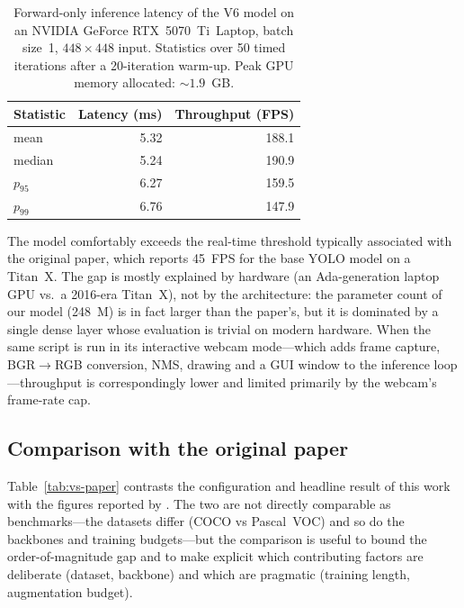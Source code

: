 \begin{table}[!ht]
\centering
\caption{Forward-only inference latency of the V6 model on an NVIDIA
GeForce RTX~5070~Ti~Laptop, batch size~1, $448\!\times\!448$ input. Statistics
over 50 timed iterations after a 20-iteration warm-up. Peak GPU memory
allocated: $\sim\!1.9$~GB.}
\label{tab:latency}
\small
\begin{tabular}{lrr}
\toprule
\textbf{Statistic} & \textbf{Latency (ms)} & \textbf{Throughput (FPS)} \\
\midrule
mean         & 5.32 & 188.1 \\
median       & 5.24 & 190.9 \\
$p_{95}$     & 6.27 & 159.5 \\
$p_{99}$     & 6.76 & 147.9 \\
\bottomrule
\end{tabular}
\end{table}

\noindent The model comfortably exceeds the real-time threshold typically
associated with the original paper, which reports 45~FPS for the base YOLO
model on a Titan~X. The gap is mostly explained by hardware
(an Ada-generation laptop GPU vs.\ a 2016-era Titan~X), not by the
architecture: the parameter count of our model (248~M) is in fact larger than
the paper's, but it is dominated by a single dense layer whose evaluation is
trivial on modern hardware. When the same script is run in its interactive
webcam mode---which adds frame capture, BGR$\to$RGB conversion, NMS, drawing
and a GUI window to the inference loop---throughput is correspondingly lower
and limited primarily by the webcam's frame-rate cap.

\subsection{Comparison with the original paper}
\label{sec:results:vs-paper}

Table~\ref{tab:vs-paper} contrasts the configuration and headline result of
this work with the figures reported by \citet{redmon2016you}. The two are not
directly comparable as benchmarks---the datasets differ (COCO vs Pascal~VOC)
and so do the backbones and training budgets---but the comparison is useful
to bound the order-of-magnitude gap and to make explicit which contributing
factors are deliberate (dataset, backbone) and which are pragmatic (training
length, augmentation budget).

